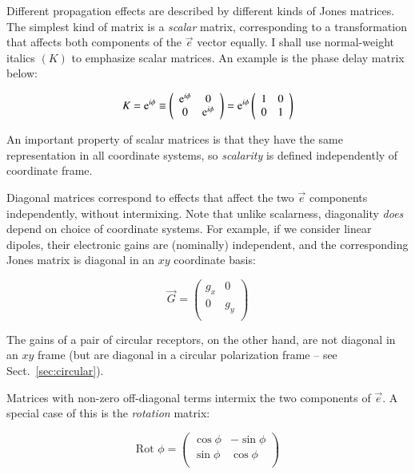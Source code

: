 \documentclass[referee]{aa}
\newcommand{\jones}[2]{\vec {#1}_{#2}}
\begin{document}
Different propagation effects are described by different kinds of Jones matrices. The simplest kind of matrix is a {\em scalar} matrix, corresponding to a transformation that affects both components of the $\vec e$ vector equally. I shall use normal-weight italics $(K)$ to emphasize scalar matrices. An example is the phase delay matrix below:

    \[
    K = {\rm e}^{i\phi} \equiv 
    \left( 
    \begin{array}{cc}
    {\rm e}^{i\phi} & 0 \\
    0 & {\rm e}^{i\phi} \\
    \end{array}
    \right) =   
    {\rm e}^{i\phi} \left( 
    \begin{array}{cc}
    1 & 0 \\
    0 & 1 \\
    \end{array}
    \right)    
    \]

An important property of scalar matrices is that they have the same representation in all coordinate systems, so {\em scalarity} is defined independently of coordinate frame.

Diagonal matrices correspond to effects that affect the two $\vec e$ components independently, without intermixing. Note that unlike scalarness, diagonality {\em does} depend on choice of coordinate systems. For example, if we consider linear dipoles, their electronic gains are (nominally) independent, and the corresponding Jones matrix is diagonal in an $xy$ coordinate basis:

    \[
    \jones{G}{} = 
    \left( 
    \begin{array}{cc}
    g_x & 0 \\
    0 & g_y \\
    \end{array}
    \right) 
    \]

The gains of a pair of circular receptors, on the other hand, are not diagonal in an $xy$ frame (but are diagonal in a circular polarization frame -- see Sect.~\ref{sec:circular}).

Matrices with non-zero off-diagonal terms intermix the two components of $\vec e$. A special case of this is the {\em rotation} matrix:

    \[
    \mbox{Rot~}\phi = 
    \left( 
    \begin{array}{cc}
    \cos\phi & -\sin\phi \\
    \sin\phi & \cos\phi \\
    \end{array}
    \right) 
    \]
\end{document}
